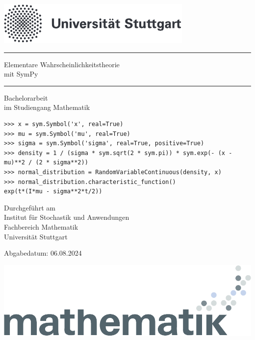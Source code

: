 \bgroup

\begin{titlepage}
\begin{flushleft}
\includegraphics[width=0.4\linewidth]{./Section/Titel/logo_uni.pdf}
\end{flushleft}

\vspace*{2.5cm}

\begin{center}
{\par\noindent\rule{\textwidth}{0.4pt}
\par\huge Elementare Wahrscheinlichkeitstheorie\\
mit SymPy
\par\noindent\rule{\textwidth}{0.4pt}}

\vspace*{1cm}
{\Large Bachelorarbeit\\
im Studiengang Mathematik}
\end{center}

\vspace*{0.7cm}

\begin{center}
\begin{framed}
\begin{footnotesize}
\begin{verbatim}
>>> x = sym.Symbol('x', real=True)
>>> mu = sym.Symbol('mu', real=True)
>>> sigma = sym.Symbol('sigma', real=True, positive=True)
>>> density = 1 / (sigma * sym.sqrt(2 * sym.pi)) * sym.exp(- (x - mu)**2 / (2 * sigma**2))
>>> normal_distribution = RandomVariableContinuous(density, x)
>>> normal_distribution.characteristic_function()
exp(t*(I*mu - sigma**2*t/2))
\end{verbatim}
\end{footnotesize}
\end{framed}
\end{center}

\vspace*{3cm}

\begin{center}
{Durchgeführt am\\
Institut für Stochastik und Anwendungen\\
Fachbereich Mathematik\\
Universität Stuttgart}
\end{center}

\begin{center}
Abgabedatum: 06.08.2024
\end{center}

\vfill

\begin{flushright}
\includegraphics[width=0.2\linewidth]{./Section/Titel/mathebanner.pdf}
\end{flushright}
\end{titlepage}

\egroup